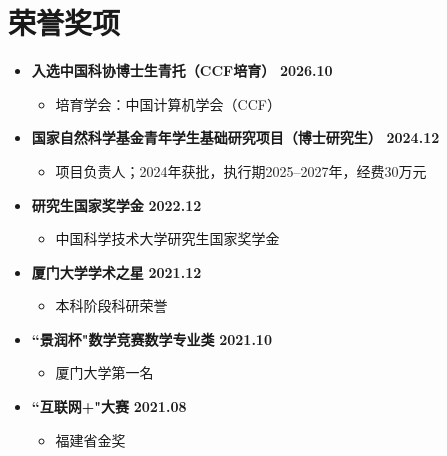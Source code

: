 \documentclass{resume}
\begin{document}
\section{\makebox[.75em][c]{\faTrophy} \textbf{\fangsong 荣誉奖项}}
\vspace{.5mm}
\begin{itemize}[leftmargin=0em, itemsep=3pt]
    \item \textbf{\fangsong 入选中国科协博士生青托（CCF培育）} \hfill \textbf{2026.10}
    \begin{itemize}[leftmargin=1.5em]
        \item \kaishu 培育学会：中国计算机学会（CCF）
    \end{itemize}

    \item \textbf{\fangsong 国家自然科学基金青年学生基础研究项目（博士研究生）} \hfill \textbf{2024.12}
    \begin{itemize}[leftmargin=1.5em]
        \item \kaishu 项目负责人；2024年获批，执行期2025--2027年，经费30万元
    \end{itemize}

    \item \textbf{\fangsong 研究生国家奖学金} \hfill \textbf{2022.12}
    \begin{itemize}[leftmargin=1.5em]
        \item \kaishu 中国科学技术大学研究生国家奖学金
    \end{itemize}

    \item \textbf{\fangsong 厦门大学学术之星} \hfill \textbf{2021.12}
    \begin{itemize}[leftmargin=1.5em]
        \item \kaishu 本科阶段科研荣誉
    \end{itemize}

    \item \textbf{\fangsong ``景润杯"数学竞赛数学专业类} \hfill \textbf{2021.10}
    \begin{itemize}[leftmargin=1.5em]
        \item \kaishu 厦门大学第一名
    \end{itemize}

    \item \textbf{\fangsong ``互联网+"大赛} \hfill \textbf{2021.08}
    \begin{itemize}[leftmargin=1.5em]
        \item \kaishu 福建省金奖
    \end{itemize}


\end{itemize}
\end{document}
